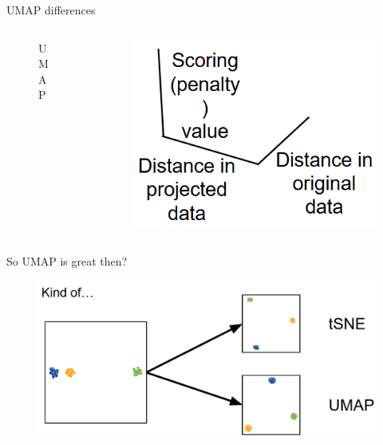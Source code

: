 \begin{frame}[allowframebreaks]{UMAP differences}
\begin{columns}
\begin{column}{0.4\textwidth}
\begin{figure}
            \caption{UMAP}
        \end{figure}
    \end{column}
    \begin{column}{0.22\textwidth}
        \begin{figure}
            \centering
            \includegraphics[width=1\textwidth,keepaspectratio]{images/dul/dim-reduce/slide_41_3_img.png}
        \end{figure}
    \end{column}
    \end{columns}
\end{frame}

\begin{frame}[allowframebreaks]{So UMAP is great then?}
    \begin{figure}
        \centering
        \includegraphics[width=1\textwidth,keepaspectratio]{images/dul/dim-reduce/slide_42_1_img.png}
    \end{figure}
\end{frame}

